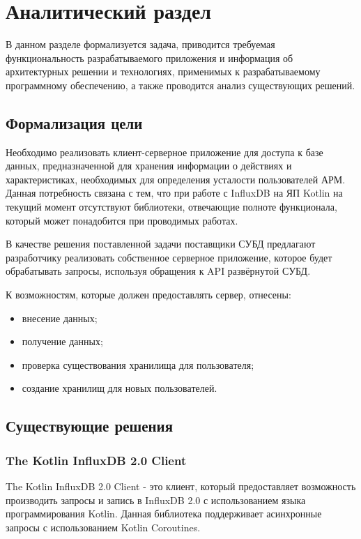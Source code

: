 \section{Аналитический раздел}
В данном разделе формализуется задача, приводится требуемая функциональность разрабатываемого приложения и информация об архитектурных решении и технологиях, применимых к разрабатываемому программному обеспечению, а также проводится анализ существующих решений.

\subsection{Формализация цели}
Необходимо реализовать клиент-серверное приложение для доступа к базе данных, предназначенной для хранения информации о действиях и характеристиках, необходимых для определения усталости пользователей АРМ. Данная потребность связана с тем, что при работе с InfluxDB на ЯП Kotlin на текущий момент отсутствуют библиотеки, отвечающие полноте функционала, который может понадобится при проводимых работах.

В качестве решения поставленной задачи поставщики СУБД предлагают разработчику реализовать собственное серверное приложение, которое будет обрабатывать запросы, используя обращения к API развёрнутой СУБД.

К возможностям, которые должен предоставлять сервер, отнесены:
\begin{itemize}[leftmargin=1.6\parindent]
\item внесение данных;
\item получение данных;
\item проверка существования хранилища для пользователя;
\item создание хранилищ для новых пользователей.
\end{itemize}

\subsection{Существующие решения}
\subsubsection{The Kotlin InfluxDB 2.0 Client}
The Kotlin InfluxDB 2.0 Client \cite{influxClient} - это клиент, который предоставляет возможность производить запросы и запись в InfluxDB 2.0 с использованием языка программирования Kotlin. Данная библиотека поддерживает асинхронные запросы с использованием Kotlin Coroutines.


